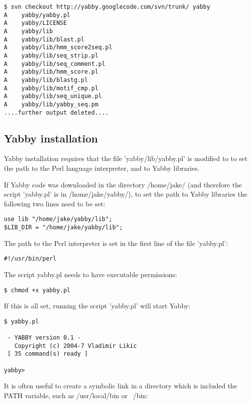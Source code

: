 \begin{verbatim}
$ svn checkout http://yabby.googlecode.com/svn/trunk/ yabby
A    yabby/yabby.pl
A    yabby/LICENSE
A    yabby/lib
A    yabby/lib/blast.pl
A    yabby/lib/hmm_score2seq.pl
A    yabby/lib/seq_strip.pl
A    yabby/lib/seq_comment.pl
A    yabby/lib/hmm_score.pl
A    yabby/lib/blastg.pl
A    yabby/lib/motif_cmp.pl
A    yabby/lib/seq_unique.pl
A    yabby/lib/yabby_seq.pm
....further output deleted....
\end{verbatim}

\subsection{Yabby installation}

Yabby installation requires that the file 'yabby/lib/yabby.pl' is
modified to to set the path to the Perl language interpreter,
and to Yabby libraries.

If Yabby code was downloaded in the directory /home/jake/ (and
therefore the script 'yabby.pl' is in /home/jake/yabby/), to set
the path to Yabby libraries the following two lines need to be
set: 

\begin{verbatim}
use lib "/home/jake/yabby/lib";
$LIB_DIR = "/home/jake/yabby/lib";
\end{verbatim}

The path to the Perl interpreter is set in the first line of the
file 'yabby.pl':

\begin{verbatim}
#!/usr/bin/perl
\end{verbatim}

The script yabby.pl needs to have executable permissions:

\begin{verbatim}
$ chmod +x yabby.pl
\end{verbatim}

If this is all set, running the script 'yabby.pl' will start Yabby:

\begin{verbatim}
$ yabby.pl

 - YABBY version 0.1 - 
   Copyright (c) 2004-7 Vladimir Likic
 [ 35 command(s) ready ]

yabby>
\end{verbatim}

It is often useful to create a symbolic link in a directory which
is included the PATH variable, such as /usr/local/bin or ~/bin:

